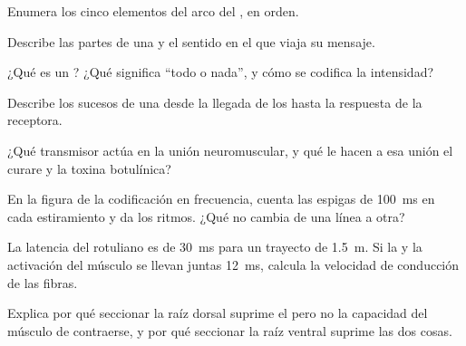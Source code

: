\begin{exercise}[$\star$]\label{exo:g12:stretch-reflex:1}
Enumera los cinco elementos del arco del , en orden.
\end{exercise}

\begin{exercise}[$\star$]\label{exo:g12:stretch-reflex:2}
Describe las partes de una  y el sentido en el que viaja su
mensaje.
\end{exercise}

\begin{exercise}[$\star$]\label{exo:g12:stretch-reflex:3}
¿Qué es un ? ¿Qué significa ``todo o nada'', y cómo
se codifica la intensidad?
\end{exercise}

\begin{exercise}[$\star$]\label{exo:g12:stretch-reflex:4}
Describe los sucesos de una  desde la llegada de los
 hasta la respuesta de la  receptora.
\end{exercise}

\begin{exercise}[$\star$]\label{exo:g12:stretch-reflex:5}
¿Qué transmisor actúa en la unión neuromuscular, y qué le hacen a esa
unión el curare y la toxina botulínica?
\end{exercise}

\begin{exercise}[$\star\star$]\label{exo:g12:stretch-reflex:6}
En la figura de la codificación en frecuencia, cuenta las espigas de
\qty{100}{ms} en cada estiramiento y da los ritmos. ¿Qué no cambia de
una línea a otra?
\end{exercise}

\begin{exercise}[$\star\star$]\label{exo:g12:stretch-reflex:7}
La latencia del  rotuliano es de \qty{30}{ms} para un trayecto
de \qty{1.5}{m}. Si la  y la activación del músculo se llevan
juntas \qty{12}{ms}, calcula la velocidad de conducción de las fibras.
\end{exercise}

\begin{exercise}[$\star\star$]\label{exo:g12:stretch-reflex:8}
Explica por qué seccionar la raíz dorsal suprime el  pero no la
capacidad del músculo de contraerse, y por qué seccionar la raíz
ventral suprime las dos cosas.
\end{exercise}

